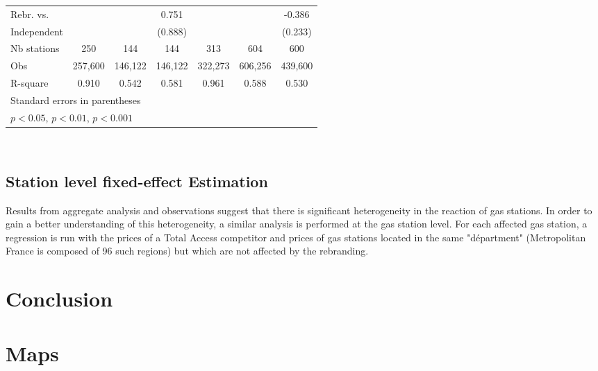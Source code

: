 \documentclass[11pt]{article}
\begin{document}
\begin{table}[h]
\begin{tabular}{lcccccc}
\hline
Rebr. vs.           &                                  &                               & 0.751                     &                                    &                                   & -0.386                       \\
Independent     &                                  &                               & (0.888)                  &                                    &                                    & (0.233)                     \\
\hline
Nb stations       & 250                           & 144                        & 144                         & 313                              & 604                            & 600                            \\
Obs                   & 257,600                    & 146,122                &  146,122                 & 322,273                      &  606,256                    & 439,600                     \\
R-square           & 0.910                        & 0.542                    &  0.581                     & 0.961                          &  0.588                        &  0.530                       \\
\hline\hline
\multicolumn{7}{l}{\footnotesize Standard errors in parentheses}\\
\multicolumn{7}{l}{\footnotesize \sym{*} \(p<0.05\), \sym{**} \(p<0.01\), \sym{***} \(p<0.001\)}\\
\end{tabular}
\\
\label{table:ta_fe_agg}
\end{table}

\subsection{Station level fixed-effect Estimation}

Results from aggregate analysis and observations suggest that there is significant heterogeneity in the reaction of gas stations. In order to gain a better understanding of this heterogeneity, a similar analysis is performed at the gas station level. For each affected gas station, a regression is run with the prices of a Total Access competitor and prices of gas stations located in the same "départment" (Metropolitan France is composed of 96 such regions) but which are not affected by the rebranding.

\section{Conclusion}

\newpage



\newpage

\appendix

\section{Maps}
\end{document}
